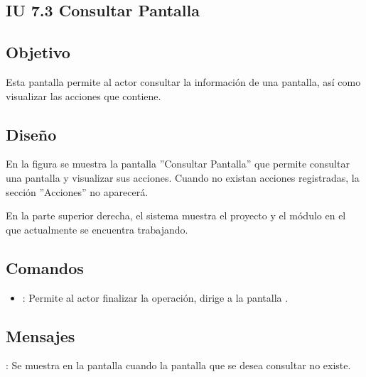 \subsection{IU 7.3 Consultar Pantalla}

\subsection{Objetivo}
	Esta pantalla permite al actor consultar la información de una pantalla, así como visualizar las acciones que contiene.
\subsection{Diseño}
	En la figura  se muestra la pantalla ''Consultar Pantalla'' que permite consultar una pantalla y visualizar sus acciones. Cuando no existan acciones registradas, la sección ''Acciones'' no aparecerá.
	
	En la parte superior derecha, el sistema muestra el proyecto y el módulo en el que actualmente se encuentra trabajando.

\subsection{Comandos}
\begin{itemize}
	\item {}: Permite al actor finalizar la operación, dirige a la pantalla .
\end{itemize}

\subsection{Mensajes}

\begin{Citemize}
	\item {}: Se muestra en la pantalla  cuando la pantalla que se desea consultar no existe.
\end{Citemize}
